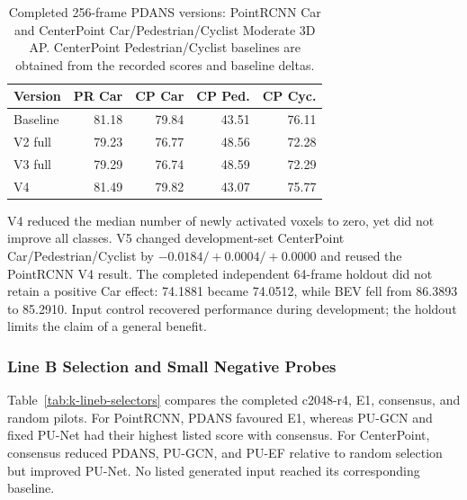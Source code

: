 \begin{table}[!t]\centering\setlength{\tabcolsep}{4pt}
\begin{tabular}{lrrrr}\toprule
Version & PR Car & CP Car & CP Ped. & CP Cyc.\\\midrule
Baseline & 81.18 & 79.84 & 43.51 & 76.11\\
V2 full & 79.23 & 76.77 & 48.56 & 72.28\\
V3 full & 79.29 & 76.74 & 48.59 & 72.29\\
V4 & 81.49 & 79.82 & 43.07 & 75.77\\
\bottomrule\end{tabular}
\caption{Completed 256-frame PDANS versions: PointRCNN Car and CenterPoint Car/Pedestrian/Cyclist Moderate 3D AP. CenterPoint Pedestrian/Cyclist baselines are obtained from the recorded scores and baseline deltas.}\label{tab:k-versions}\end{table}

V4 reduced the median number of newly activated voxels to zero,
yet did not improve all classes. V5 changed development-set
CenterPoint Car/Pedestrian/Cyclist by
$-0.0184/+0.0004/+0.0000$ and reused the PointRCNN V4 result.
The completed independent 64-frame holdout did not retain a positive
Car effect: 74.1881 became 74.0512, while BEV fell from 86.3893
to 85.2910. Input control recovered performance during development;
the holdout limits the claim of a general benefit.

\subsubsection{Line B Selection and Small Negative Probes}
Table~\ref{tab:k-lineb-selectors} compares the completed c2048-r4,
E1, consensus, and random pilots. For PointRCNN, PDANS favoured E1,
whereas PU-GCN and fixed PU-Net had their highest listed score with
consensus. For CenterPoint, consensus reduced PDANS, PU-GCN, and
PU-EF relative to random selection but improved PU-Net.
No listed generated input reached its corresponding baseline.

